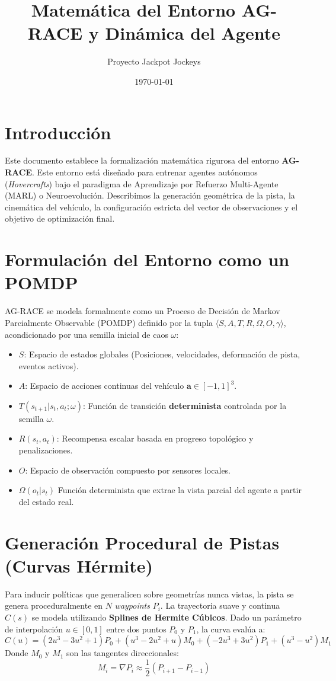 \documentclass[a4paper,11pt]{article}
\title{\textbf{Matemática del Entorno AG-RACE y Dinámica del Agente}}
\author{Proyecto Jackpot Jockeys}
\date{\today}
\begin{document}
\maketitle

\section{Introducción}
Este documento establece la formalización matemática rigurosa del entorno \textbf{AG-RACE}. Este entorno está diseñado para entrenar agentes autónomos (\textit{Hovercrafts}) bajo el paradigma de Aprendizaje por Refuerzo Multi-Agente (MARL) o Neuroevolución. Describimos la generación geométrica de la pista, la cinemática del vehículo, la configuración estricta del vector de observaciones y el objetivo de optimización final.

\section{Formulación del Entorno como un POMDP}
AG-RACE se modela formalmente como un Proceso de Decisión de Markov Parcialmente Observable (POMDP) definido por la tupla $\langle S, A, T, R, \Omega, O, \gamma \rangle$, acondicionado por una semilla inicial de caos $\omega$:

\begin{itemize}
    \item $S$: Espacio de estados globales (Posiciones, velocidades, deformación de pista, eventos activos).
    \item $A$: Espacio de acciones continuas del vehículo $\mathbf{a} \in [-1, 1]^3$.
    \item $T(s_{t+1} | s_t, a_t; \omega)$: Función de transición \textbf{determinista} controlada por la semilla $\omega$.
    \item $R(s_t, a_t)$: Recompensa escalar basada en progreso topológico y penalizaciones.
    \item $O$: Espacio de observación compuesto por sensores locales.
    \item $\Omega(o_t | s_t)$ Función determinista que extrae la vista parcial del agente a partir del estado real.
\end{itemize}

\section{Generación Procedural de Pistas (Curvas Hérmite)}
Para inducir políticas que generalicen sobre geometrías nunca vistas, la pista se genera proceduralmente en $N$ \textit{waypoints} $P_i$.
La trayectoria suave y continua $C(s)$ se modela utilizando \textbf{Splines de Hermite Cúbicos}. 
Dado un parámetro de interpolación $u \in [0, 1]$ entre dos puntos $P_0$ y $P_1$, la curva evalúa a:
$$ C(u) = (2u^3 - 3u^2 + 1)P_0 + (u^3 - 2u^2 + u)M_0 + (-2u^3 + 3u^2)P_1 + (u^3 - u^2)M_1 $$
Donde $M_0$ y $M_1$ son las tangentes direccionales:
$$ M_i = \nabla P_i \approx \frac{1}{2}(P_{i+1} - P_{i-1}) $$
\end{document}
